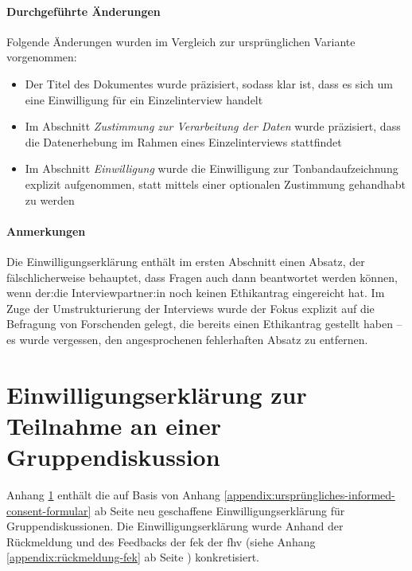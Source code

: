 \documentclass[a4paper,12pt,twoside]{scrreprt}
\begin{document}
\subsubsection*{Durchgeführte Änderungen}
\label{appendix:änderungen-informed-consent-einzelinterview}

Folgende Änderungen wurden im Vergleich zur ursprünglichen Variante vorgenommen:
\begin{itemize}
    \item Der Titel des Dokumentes wurde präzisiert, sodass klar ist, dass es sich um eine Einwilligung für ein Einzelinterview handelt
    \item Im Abschnitt \textit{Zustimmung zur Verarbeitung der Daten} wurde präzisiert, dass die Datenerhebung im Rahmen eines Einzelinterviews stattfindet
    \item Im Abschnitt \textit{Einwilligung} wurde die Einwilligung zur Tonbandaufzeichnung explizit aufgenommen, statt mittels einer optionalen Zustimmung gehandhabt zu werden
\end{itemize}

\subsubsection*{Anmerkungen}
\label{appendix:anmerkungen-informed-consent-einzelinterview}

Die Einwilligungserklärung enthält im ersten Abschnitt einen Absatz, der fälschlicherweise behauptet, dass Fragen auch dann beantwortet werden können, wenn der:die Interviewpartner:in noch keinen Ethikantrag eingereicht hat. Im Zuge der Umstrukturierung der Interviews wurde der Fokus explizit auf die Befragung von Forschenden gelegt, die bereits einen Ethikantrag gestellt haben -- es wurde vergessen, den angesprochenen fehlerhaften Absatz zu entfernen.



\chapter{Einwilligungserklärung zur Teilnahme an einer Gruppendiskussion}
\label{appendix:informed-consent-gruppendiskussion}

Anhang \ref{appendix:informed-consent-gruppendiskussion} enthält die auf Basis von Anhang \ref{appendix:ursprüngliches-informed-consent-formular} ab Seite \pageref{appendix:ursprüngliches-informed-consent-formular} neu geschaffene Einwilligungserklärung für Gruppendiskussionen. Die Einwilligungserklärung wurde Anhand der Rückmeldung und des Feedbacks der \acl{fek} der \acl{fhv} (siehe Anhang \ref{appendix:rückmeldung-fek} ab Seite \pageref{appendix:rückmeldung-fek}) konkretisiert.
\end{document}
